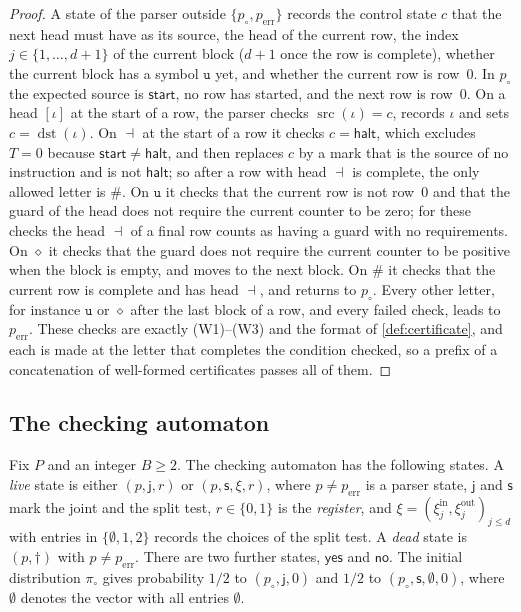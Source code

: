 \documentclass[11pt]{article}
\theoremstyle{plain}
\theoremstyle{definition}
\theoremstyle{remark}
\newcommand{\yes}{\mathsf{yes}}
\newcommand{\no}{\mathsf{no}}
\newcommand{\jt}{\mathsf{j}}
\newcommand{\spl}{\mathsf{s}}
\newcommand{\dead}{\dagger}
\newcommand{\start}{\mathsf{start}}
\newcommand{\halt}{\mathsf{halt}}
\newcommand{\un}{\mathtt{u}}
\newcommand{\fin}{\dashv}
\newcommand{\src}{\operatorname{src}}
\newcommand{\dst}{\operatorname{dst}}
\newcommand{\pin}{p_{\circ}}
\newcommand{\perr}{p_{\mathrm{err}}}
\begin{document}
\begin{proof}
A state of the parser outside $\{\pin,\perr\}$ records the control state $c$ that the next head must have as its source, the head of the current row, the index $j\in\{1,\dots,d+1\}$ of the current block ($d+1$ once the row is complete), whether the current block has a symbol $\un$ yet, and whether the current row is row~$0$. In $\pin$ the expected source is $\start$, no row has started, and the next row is row~$0$. On a head $[\iota]$ at the start of a row, the parser checks $\src(\iota)=c$, records $\iota$ and sets $c=\dst(\iota)$. On $\fin$ at the start of a row it checks $c=\halt$, which excludes $T=0$ because $\start\ne\halt$, and then replaces $c$ by a mark that is the source of no instruction and is not $\halt$; so after a row with head $\fin$ is complete, the only allowed letter is $\#$. On $\un$ it checks that the current row is not row~$0$ and that the guard of the head does not require the current counter to be zero; for these checks the head $\fin$ of a final row counts as having a guard with no requirements. On $\diamond$ it checks that the guard does not require the current counter to be positive when the block is empty, and moves to the next block. On $\#$ it checks that the current row is complete and has head $\fin$, and returns to $\pin$. Every other letter, for instance $\un$ or $\diamond$ after the last block of a row, and every failed check, leads to $\perr$. These checks are exactly (W1)--(W3) and the format of \cref{def:certificate}, and each is made at the letter that completes the condition checked, so a prefix of a concatenation of well-formed certificates passes all of them.
\end{proof}

\subsection{The checking automaton}

Fix $P$ and an integer $B\ge2$. The checking automaton has the following states. A \emph{live} state is either $(p,\jt,r)$ or $(p,\spl,\xi,r)$, where $p\ne\perr$ is a parser state, $\jt$ and $\spl$ mark the joint and the split test, $r\in\{0,1\}$ is the \emph{register}, and $\xi=(\xi^{\mathrm{in}}_j,\xi^{\mathrm{out}}_j)_{j\le d}$ with entries in $\{\emptyset,1,2\}$ records the choices of the split test. A \emph{dead} state is $(p,\dead)$ with $p\ne\perr$. There are two further states, $\yes$ and $\no$. The initial distribution $\pi_\circ$ gives probability $1/2$ to $(\pin,\jt,0)$ and $1/2$ to $(\pin,\spl,\emptyset,0)$, where $\emptyset$ denotes the vector with all entries $\emptyset$.
\end{document}
